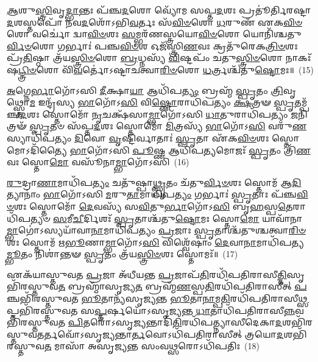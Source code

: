 {\anuvakamend[{\-\ul{𑌦𑍇}\-𑌵𑌤𑌾\-𑌽\-𑌽𑌯𑍁᳴𑌷𑍇 \ul{𑌤𑍍𑌵𑌾} 𑌷𑌟𑍍𑌚᳴}]}%

\-\ul{𑌆}\-𑌶𑍁\-\ul{𑌸𑍍𑌤𑍍𑌰𑌿}\-𑌵𑍃\-\ul{𑌦𑍍𑌭𑌾}\-𑌨𑍍𑌤𑌃 𑌪᳴𑌞𑍍𑌚\-\ul{𑌦}\-𑌶𑍋 𑌵𑍍𑌯𑍋᳴𑌮 𑌸𑌪𑍍𑌤\-\ul{𑌦}\-𑌶𑌃 𑌪𑍍𑌰𑌤𑍂॑𑌰𑍍𑌤𑌿𑌰𑌷𑍍𑌟𑌾\-\ul{𑌦}\-𑌶𑌸𑍍𑌤𑌪𑍋᳴ 𑌨𑌵\-\ul{𑌦}\-𑌶𑍋᳴\-𑌽𑌭𑌿\-\ul{𑌵}\-𑌰𑍍𑌤𑌃 𑌸᳴\-\ul{𑌵𑌿}\-\-\ul{𑍞}\-𑌶𑍋 \ul{𑌧}\-𑌰𑍁𑌣᳴ 𑌏𑌕\-\ul{𑌵𑌿}\-\-\ul{𑍞}\-𑌶𑍋 𑌵𑌰𑍍𑌚𑍋॑ 𑌦𑍍𑌵𑌾\-\ul{𑌵𑌿}\-\-\ul{𑍞}\-𑌶𑌃 \ul{𑌸}\-𑌮𑍍𑌭𑌰᳴𑌣𑌸𑍍𑌤𑍍𑌰𑌯𑍋\-\ul{𑌵𑌿}\-\-\ul{𑍞}\-𑌶𑍋 𑌯𑍋𑌨𑌿᳴𑌶𑍍𑌚𑌤𑍁\-\ul{𑌰𑍍𑌵𑌿}\-\-\ul{𑍞}\-𑌶𑍋 𑌗𑌰𑍍𑌭𑌾𑌃॑ 𑌪𑌞𑍍𑌚\-\ul{𑌵𑌿}\-\-\ul{𑍞}\-𑌶 𑌓𑌜᳴𑌸𑍍𑌤𑍍𑌰𑌿\-\ul{𑌣}\-𑌵𑌃 𑌕𑍍𑌰𑌤𑍁᳴𑌰𑍇𑌕\-\ul{𑌤𑍍𑌰𑌿}\-\-\ul{𑍞}\-𑌶𑌃 𑌪𑍍𑌰᳴\-\ul{𑌤𑌿}\-𑌷𑍍𑌠𑌾 𑌤𑍍𑌰᳴𑌯\-\ul{𑌸𑍍𑌤𑍍𑌰𑌿}\-\-\ul{𑍞}\-𑌶𑍋 \ul{𑌬𑍍𑌰}\-𑌧𑍍𑌨𑌸𑍍𑌯᳴ \ul{𑌵𑌿}\-𑌷𑍍𑌟𑌪𑌂᳴ 𑌚𑌤𑍁\-\ul{𑌸𑍍𑌤𑍍𑌰𑌿}\-\-\ul{𑍞}\-𑌶𑍋 𑌨𑌾𑌕𑌃᳴ 𑌷\-\ul{𑌟𑍍𑌤𑍍𑌰𑌿}\-\-\ul{𑍞}\-𑌶𑍋 𑌵𑌿᳴\-\ul{𑌵}\-𑌰𑍍𑌤𑍋॑\-𑌽𑌷𑍍𑌟𑌾𑌚𑌤𑍍𑌵𑌾\-\ul{𑌰𑌿}\-\-\ul{𑍞}\-𑌶𑍋 \ul{𑌧}\-𑌰𑍍𑌤𑍍𑌰𑌶𑍍𑌚᳴𑌤𑍁\-\ul{𑌷𑍍𑌟𑍋}\-𑌮𑌃॥~(15)

{\anuvakamend[{\-\ul{𑌆}\-𑌶𑍁𑌃 \ul{𑌸}\-𑌪𑍍𑌤𑌤𑍍𑌰𑌿𑍞᳴𑌶𑌤𑍍}]}%

\-\ul{𑌅}\-𑌗𑍍𑌨𑍇\-\ul{𑌰𑍍𑌭𑌾}\-𑌗𑍋᳴\-𑌽𑌸𑌿 \ul{𑌦𑍀}\-𑌕𑍍𑌷𑌾\-\ul{𑌯𑌾} 𑌆𑌧𑌿᳴𑌪\-\ul{𑌤𑍍𑌯𑌂} 𑌬𑍍𑌰𑌹𑍍𑌮᳴ \ul{𑌸𑍍𑌪𑍃}\-𑌤𑌂 \ul{𑌤𑍍𑌰𑌿}\-𑌵𑍃𑌥𑍍𑌸𑍍𑌤𑍋\-\ul{𑌮} 𑌇𑌨𑍍𑌦𑍍𑌰᳴𑌸𑍍𑌯 \ul{𑌭𑌾}\-𑌗𑍋᳴\-𑌽\-\ul{𑌸𑌿} 𑌵𑌿\-\ul{𑌷𑍍𑌣𑍋}\-𑌰𑌾𑌧𑌿᳴𑌪𑌤𑍍𑌯𑌂 \ul{𑌕𑍍𑌷}\-𑌤𑍍𑌰𑍟 \ul{𑌸𑍍𑌪𑍃}\-𑌤𑌮𑍍𑌪᳴𑌞𑍍𑌚\-\ul{𑌦}\-𑌶𑌃 𑌸𑍍𑌤𑍋𑌮𑍋᳴ \ul{𑌨𑍃}\-𑌚𑌕𑍍𑌷᳴𑌸𑌾\-\ul{𑌮𑍍𑌭𑌾}\-𑌗𑍋᳴\-𑌽𑌸𑌿 \ul{𑌧𑌾}\-𑌤𑍁𑌰𑌾𑌧𑌿᳴𑌪𑌤𑍍𑌯𑌂 \ul{𑌜}\-𑌨𑌿𑌤𑍍𑌰𑍟᳴ \ul{𑌸𑍍𑌪𑍃}\-𑌤𑍞 𑌸᳴𑌪𑍍𑌤\-\ul{𑌦}\-𑌶𑌃 𑌸𑍍𑌤𑍋𑌮𑍋᳴ \ul{𑌮𑌿}\-𑌤𑍍𑌰𑌸𑍍𑌯᳴ \ul{𑌭𑌾}\-𑌗𑍋᳴\-𑌽\-\ul{𑌸𑌿} 𑌵𑌰𑍁᳴\-\ul{𑌣}\-𑌸𑍍𑌯𑌾𑌧𑌿᳴𑌪𑌤𑍍𑌯𑌂 \ul{𑌦𑌿}\-𑌵𑍋 \ul{𑌵𑍃}\-𑌷𑍍𑌟𑌿𑌰𑍍𑌵𑌾𑌤𑌾𑌃॑ \ul{𑌸𑍍𑌪𑍃}\-𑌤𑌾 𑌏᳴𑌕\-\ul{𑌵𑌿}\-\-\ul{𑍞}\-𑌶𑌃 𑌸𑍍𑌤𑍋𑌮𑍋\-𑌽𑌦𑌿᳴𑌤𑍍𑌯𑍈 \ul{𑌭𑌾}\-𑌗𑍋᳴\-𑌽𑌸𑌿 \ul{𑌪𑍂}\-𑌷𑍍𑌣 𑌆𑌧𑌿᳴𑌪\-\ul{𑌤𑍍𑌯}\-𑌮𑍋𑌜𑌃᳴ \ul{𑌸𑍍𑌪𑍃}\-𑌤𑌂 𑌤𑍍𑌰𑌿᳴\-\ul{𑌣}\-𑌵𑌃 𑌸𑍍𑌤𑍋\-\ul{𑌮𑍋} 𑌵𑌸𑍂᳴𑌨𑌾\-\ul{𑌮𑍍𑌭𑌾}\-𑌗𑍋᳴\-𑌽𑌸𑌿~(16)

\-\ul{𑌰𑍁}\-𑌦𑍍𑌰𑌾\-\ul{𑌣𑌾}\-𑌮𑌾𑌧𑌿᳴𑌪\-\ul{𑌤𑍍𑌯𑌂} 𑌚𑌤𑍁᳴𑌷𑍍𑌪𑌾\-\ul{𑌥𑍍𑌸𑍍𑌪𑍃}\-𑌤𑌂 𑌚᳴𑌤𑍁\-\ul{𑌰𑍍𑌵𑌿}\-\-\ul{𑍞}\-𑌶𑌃 𑌸𑍍𑌤𑍋𑌮᳴ 𑌆\-\ul{𑌦𑌿}\-𑌤𑍍𑌯𑌾𑌨𑌾𑌂॑ \ul{𑌭𑌾}\-𑌗𑍋᳴\-𑌽𑌸𑌿 \ul{𑌮}\-𑌰𑍁\-\ul{𑌤𑌾}\-𑌮𑌾𑌧𑌿᳴𑌪\-\ul{𑌤𑍍𑌯𑌂} 𑌗𑌰𑍍𑌭𑌾𑌃॑ \ul{𑌸𑍍𑌪𑍃}\-𑌤𑌾𑌃 𑌪᳴𑌞𑍍𑌚\-\ul{𑌵𑌿}\-\-\ul{𑍞}\-𑌶𑌃 𑌸𑍍𑌤𑍋𑌮𑍋᳴ \ul{𑌦𑍇}\-𑌵𑌸𑍍𑌯᳴ 𑌸\-\ul{𑌵𑌿}\-𑌤𑍁\-\ul{𑌰𑍍𑌭𑌾}\-𑌗𑍋᳴\-𑌽\-\ul{𑌸𑌿} 𑌬𑍃\-\ul{𑌹}\-𑌸𑍍𑌪\-\ul{𑌤𑍇}\-𑌰𑌾𑌧𑌿᳴𑌪𑌤𑍍𑌯𑍞 \ul{𑌸}\-𑌮𑍀\-\ul{𑌚𑍀}\-𑌰𑍍𑌦𑌿𑌶𑌃᳴ \ul{𑌸𑍍𑌪𑍃}\-𑌤𑌾𑌶𑍍𑌚᳴𑌤𑍁\-\ul{𑌷𑍍𑌟𑍋}\-𑌮𑌃 𑌸𑍍𑌤𑍋\-\ul{𑌮𑍋} 𑌯𑌾𑌵𑌾᳴𑌨𑌾\-\ul{𑌮𑍍𑌭𑌾}\-𑌗𑍋॑\-𑌽𑌸𑍍𑌯𑌯𑌾᳴𑌵𑌾\-\ul{𑌨𑌾}\-𑌮𑌾𑌧𑌿᳴𑌪𑌤𑍍𑌯𑌂 \ul{𑌪𑍍𑌰}\-𑌜𑌾𑌃 \ul{𑌸𑍍𑌪𑍃}\-𑌤𑌾𑌶𑍍𑌚᳴𑌤𑍁𑌶𑍍𑌚𑌤𑍍𑌵𑌾\-\ul{𑌰𑌿}\-\-\ul{𑍞}\-𑌶𑌃 𑌸𑍍𑌤𑍋𑌮᳴ 𑌋\-\ul{𑌭𑍂}\-𑌣𑌾\-\ul{𑌮𑍍𑌭𑌾}\-𑌗𑍋᳴\-𑌽\-\ul{𑌸𑌿} 𑌵𑌿𑌶𑍍𑌵𑍇᳴𑌷𑌾𑌂 \ul{𑌦𑍇}\-𑌵𑌾\-\ul{𑌨𑌾}\-𑌮𑌾𑌧𑌿᳴𑌪𑌤𑍍𑌯\-\ul{𑌮𑍍𑌭𑍂}\-𑌤𑌂 𑌨𑌿𑌶𑌾॑𑌨𑍍𑌤𑍟 \ul{𑌸𑍍𑌪𑍃}\-𑌤𑌂 𑌤𑍍𑌰᳴𑌯\-\ul{𑌸𑍍𑌤𑍍𑌰𑌿}\-\-\ul{𑍞}\-𑌶𑌃 𑌸𑍍𑌤𑍋𑌮𑌃᳴॥~(17)

{\anuvakamend[{𑌵𑌸𑍂᳴𑌨𑌾𑌂 \ul{𑌭𑌾}\-𑌗𑍋᳴\-𑌽\-\ul{𑌸𑌿} 𑌷𑌟𑍍𑌚᳴𑌤𑍍𑌵𑌾𑌰𑌿𑍞𑌶𑌚𑍍𑌚}]}%

𑌏𑌕᳴𑌯𑌾𑌸𑍍𑌤𑍁𑌵𑌤 \ul{𑌪𑍍𑌰}\-𑌜𑌾 𑌅᳴𑌧𑍀𑌯𑌨𑍍𑌤 \ul{𑌪𑍍𑌰}\-𑌜𑌾𑌪᳴\-\ul{𑌤𑌿}\-𑌰𑌧𑌿᳴𑌪𑌤𑌿𑌰𑌾𑌸𑍀\-\ul{𑌤𑍍𑌤𑌿}\-𑌸𑍃𑌭𑌿᳴𑌰𑌸𑍍𑌤𑍁𑌵\-\ul{𑌤} 𑌬𑍍𑌰𑌹𑍍𑌮𑌾᳴𑌸𑍃𑌜𑍍𑌯\-\ul{𑌤} 𑌬𑍍𑌰𑌹𑍍𑌮᳴\-\ul{𑌣}\-𑌸𑍍𑌪\-\ul{𑌤𑌿}\-𑌰𑌧𑌿᳴𑌪𑌤𑌿𑌰𑌾𑌸𑍀𑌤𑍍 \ul{𑌪}\-𑌞𑍍𑌚𑌭𑌿᳴𑌰𑌸𑍍𑌤𑍁𑌵𑌤 \ul{𑌭𑍂}\-𑌤𑌾𑌨𑍍𑌯᳴𑌸𑍃𑌜𑍍𑌯𑌨𑍍𑌤 \ul{𑌭𑍂}\-𑌤𑌾\-\ul{𑌨𑌾}\-𑌮𑍍𑌪\-\ul{𑌤𑌿}\-𑌰𑌧𑌿᳴𑌪𑌤𑌿𑌰𑌾𑌸𑍀\-\ul{𑌥𑍍𑌸}\-𑌪𑍍𑌤𑌭𑌿᳴𑌰𑌸𑍍𑌤𑍁𑌵𑌤 𑌸\-\ul{𑌪𑍍𑌤}\-𑌰𑍍\mbox{}𑌷𑌯𑍋᳴\-𑌽𑌸𑍃𑌜𑍍𑌯𑌨𑍍𑌤 \ul{𑌧𑌾}\-𑌤𑌾𑌧𑌿᳴𑌪𑌤𑌿𑌰𑌾\-𑌸𑍀\-\ul{𑌨𑍍𑌨}\-𑌵𑌭𑌿᳴𑌰𑌸𑍍𑌤𑍁𑌵𑌤 \ul{𑌪𑌿}\-𑌤𑌰𑍋᳴\-𑌽𑌸𑍃\-\ul{𑌜𑍍𑌯}\-𑌨𑍍𑌤𑌾𑌦𑌿᳴\-\ul{𑌤𑌿}\-𑌰𑌧𑌿᳴𑌪𑌤𑍍𑌨𑍍𑌯𑌾𑌸𑍀𑌦𑍇𑌕𑌾\-\ul{𑌦}\-𑌶𑌭𑌿᳴𑌰𑌸𑍍𑌤𑍁𑌵\-\ul{𑌤}\-𑌰𑍍𑌤𑌵𑍋᳴\-𑌽𑌸𑍃𑌜𑍍𑌯𑌨𑍍𑌤𑌾\-\ul{𑌰𑍍𑌤}\-𑌵𑍋\-𑌽𑌧𑌿᳴𑌪𑌤𑌿𑌰𑌾𑌸𑍀𑌤𑍍 𑌤𑍍𑌰𑌯𑍋\-\ul{𑌦}\-𑌶𑌭𑌿᳴𑌰𑌸𑍍𑌤𑍁𑌵\-\ul{𑌤} 𑌮𑌾𑌸𑌾᳴ 𑌅𑌸𑍃𑌜𑍍𑌯𑌨𑍍𑌤 𑌸𑌂𑌵\-\ul{𑌥𑍍𑌸}\-𑌰𑍋\-𑌽𑌧𑌿᳴𑌪𑌤𑌿𑌃~(18)

